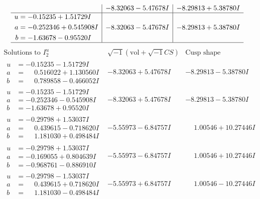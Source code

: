 \documentclass[1p]{elsarticle_modified}
\theoremstyle{definition}
\newcommand{\I}{\sqrt{-1}}
\begin{document}
$$\begin{array}{c|c|c}
 & -8.32063 - 5.47678 I & -8.29813 + 5.38780 I \\ \hline\begin{aligned}
u &= -0.15235 + 1.51729 I \\
a &= -0.252346 + 0.545908 I \\
b &= -1.63678 - 0.95520 I\end{aligned}
 & -8.32063 - 5.47678 I & -8.29813 + 5.38780 I\\
 \hline 
 \end{array}$$\newpage$$\begin{array}{c|c|c}  
\text{Solutions to }I^u_{2}& \I (\text{vol} + \sqrt{-1}CS) & \text{Cusp shape}\\
 \hline 
\begin{aligned}
u &= -0.15235 - 1.51729 I \\
a &= \phantom{-}0.516022 + 1.130560 I \\
b &= \phantom{-}0.789858 - 0.466052 I\end{aligned}
 & -8.32063 + 5.47678 I & -8.29813 - 5.38780 I \\ \hline\begin{aligned}
u &= -0.15235 - 1.51729 I \\
a &= -0.252346 - 0.545908 I \\
b &= -1.63678 + 0.95520 I\end{aligned}
 & -8.32063 + 5.47678 I & -8.29813 - 5.38780 I \\ \hline\begin{aligned}
u &= -0.29798 + 1.53037 I \\
a &= \phantom{-}0.439615 - 0.718620 I \\
b &= \phantom{-}1.181030 + 0.498484 I\end{aligned}
 & -5.55973 - 6.84757 I & \phantom{-}1.00546 + 10.27446 I \\ \hline\begin{aligned}
u &= -0.29798 + 1.53037 I \\
a &= -0.169055 + 0.804639 I \\
b &= -0.968761 - 0.886910 I\end{aligned}
 & -5.55973 - 6.84757 I & \phantom{-}1.00546 + 10.27446 I \\ \hline\begin{aligned}
u &= -0.29798 - 1.53037 I \\
a &= \phantom{-}0.439615 + 0.718620 I \\
b &= \phantom{-}1.181030 - 0.498484 I\end{aligned}
 & -5.55973 + 6.84757 I & \phantom{-}1.00546 - 10.27446 I \\ \hline\begin{aligned}

\end{aligned}
\end{array}$$
\end{document}
